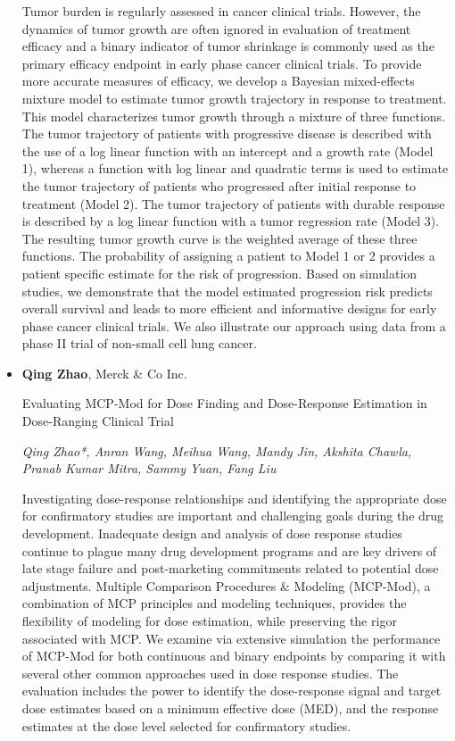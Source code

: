 \begin{itemize}
Tumor burden is regularly assessed in cancer clinical trials. However, the dynamics of tumor growth are often ignored in evaluation of treatment efficacy and a binary indicator of tumor shrinkage is commonly used as the primary efficacy endpoint in early phase cancer clinical trials. To provide more accurate measures of efficacy, we develop a Bayesian mixed-effects mixture model to estimate tumor growth trajectory in response to treatment. This model characterizes tumor growth through a mixture of three functions. The tumor trajectory of patients with progressive disease is described with the use of a log linear function with an intercept and a growth rate (Model 1), whereas a function with log linear and quadratic terms is used to estimate the tumor trajectory of patients who progressed after initial response to treatment (Model 2). The tumor trajectory of patients with durable response is described by a log linear function with a tumor regression rate (Model 3). The resulting tumor growth curve is the weighted average of these three functions. The probability of assigning a patient to Model 1 or 2 provides a patient specific estimate for the risk of progression. Based on simulation studies, we demonstrate that the model estimated progression risk predicts overall survival and leads to more efficient and informative designs for early phase cancer clinical trials. We also illustrate our approach using data from a phase II trial of non-small cell lung cancer.

\item \textbf{Qing Zhao}, Merck \& Co Inc.

Evaluating MCP-Mod for Dose Finding and Dose-Response Estimation in Dose-Ranging Clinical Trial

\emph{\footnotesize Qing Zhao*, Anran Wang, Meihua Wang, Mandy Jin, Akshita Chawla, Pranab Kumar Mitra, Sammy Yuan, Fang Liu}

Investigating dose-response relationships and identifying the appropriate dose for confirmatory studies are important and challenging goals during the drug development. Inadequate design and analysis of dose response studies continue to plague many drug development programs and are key drivers of late stage failure and post-marketing commitments related to potential dose adjustments. Multiple Comparison Procedures \& Modeling (MCP-Mod), a combination of MCP principles and modeling techniques, provides the flexibility of modeling for dose estimation, while preserving the rigor associated with MCP. We examine via extensive simulation the performance of MCP-Mod for both continuous and binary endpoints by comparing it with several other common approaches used in dose response studies. The evaluation includes the power to identify the dose-response signal and target dose estimates based on a minimum effective dose (MED), and the response estimates at the dose level selected for confirmatory studies.


\end{itemize}
